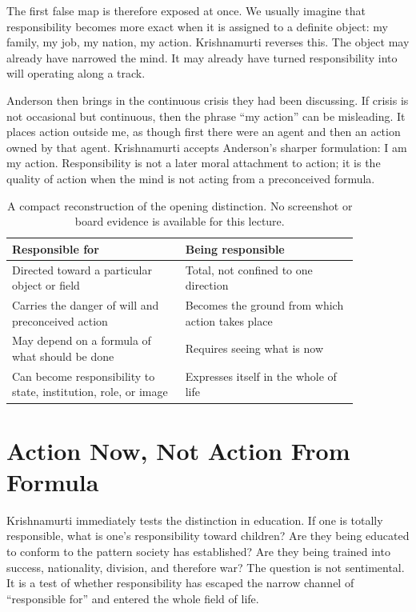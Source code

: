 The first false map is therefore exposed at once. We usually imagine that responsibility becomes more exact when it is assigned to a definite object: my family, my job, my nation, my action. Krishnamurti reverses this. The object may already have narrowed the mind. It may already have turned responsibility into will operating along a track.

Anderson then brings in the continuous crisis they had been discussing. If crisis is not occasional but continuous, then the phrase ``my action'' can be misleading. It places action outside me, as though first there were an agent and then an action owned by that agent. Krishnamurti accepts Anderson's sharper formulation: I am my action. Responsibility is not a later moral attachment to action; it is the quality of action when the mind is not acting from a preconceived formula.

\begin{table}
\centering
\begin{tabular}{|p{0.43\linewidth}|p{0.43\linewidth}|}
\hline
\textbf{Responsible for} & \textbf{Being responsible} \\
\hline
Directed toward a particular object or field & Total, not confined to one direction \\
\hline
Carries the danger of will and preconceived action & Becomes the ground from which action takes place \\
\hline
May depend on a formula of what should be done & Requires seeing what is now \\
\hline
Can become responsibility to state, institution, role, or image & Expresses itself in the whole of life \\
\hline
\end{tabular}
\caption{A compact reconstruction of the opening distinction. No screenshot or board evidence is available for this lecture.}
\end{table}

\section{Action Now, Not Action From Formula}

Krishnamurti immediately tests the distinction in education. If one is totally responsible, what is one's responsibility toward children? Are they being educated to conform to the pattern society has established? Are they being trained into success, nationality, division, and therefore war? The question is not sentimental. It is a test of whether responsibility has escaped the narrow channel of ``responsible for'' and entered the whole field of life.

